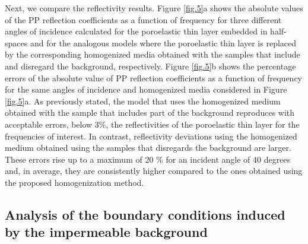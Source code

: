 \documentclass[draft]{agujournal2019}
\begin{document}
Next, we compare the reflectivity results. Figure \ref{fig.5}a shows the  absolute values of the PP reflection coefficients as a function of frequency for three different angles of incidence calculated for the poroelastic thin layer embedded in half-spaces  and for the analogous models where the poroelastic thin layer is replaced by the corresponding homogenized media obtained with the samples that include and disregard the background, respectively. Figure \ref{fig.5}b shows the percentage errors of the absolute value of PP reflection coefficients as a function of frequency for the same angles of incidence and homogenized media considered in Figure \ref{fig.5}a.  As previously stated, the model that uses the homogenized medium obtained  with the sample that includes part of the background reproduces with acceptable errors, below 3\%, the reflectivities of the poroelastic thin layer for the frequencies of interest. In contrast, reflectivity deviations using the homogenized medium obtained  using the samples that disregards the background are larger. These errors rise up to a maximum of 20 \% for an incident angle of 40 degrees and, in average, they are consistently higher compared to the ones obtained using the proposed homogenization method.

\subsection{Analysis of the boundary conditions induced by the impermeable background} 
\end{document}
